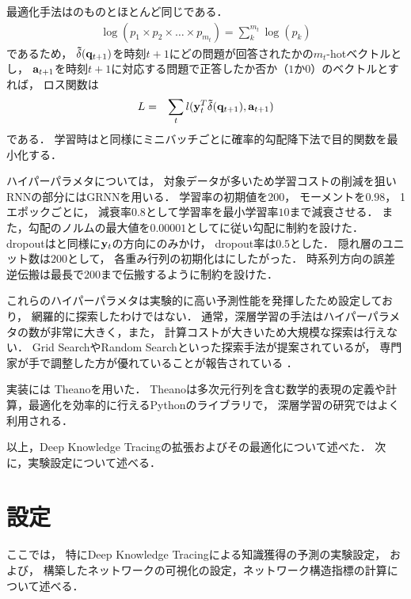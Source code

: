 最適化手法は\cite{piech2015deep}のものとほとんど同じである．
\begin{eqnarray}
	\log(p_1 \times p_2 \times \dots \times p_{m_t}) = \sum_{k}^{m_t} \log(p_k)
\end{eqnarray}
であるため，
${\bf\tilde{ \delta}}({\bf q}_{t+1})$を時刻$t+1$にどの問題が回答されたかの$m_t$-hotベクトルとし，
${\bf a}_{t+1}$を時刻$t+1$に対応する問題で正答したか否か（$1$か$0$）のベクトルとすれば，
ロス関数は
\begin{eqnarray}
L &=& \sum_t l({\bf y}_t^T {\bf \tilde{\delta}}({\bf q}_{t+1}), {\bf a}_{t+1})
\end{eqnarray}
である．
学習時は\cite{piech2015deep}と同様にミニバッチごとに確率的勾配降下法で目的関数を最小化する．

ハイパーパラメタについては，
対象データが多いため学習コストの削減を狙いRNNの部分にはGRNNを用いる．
学習率の初期値を$200$，
モーメントを$0.98$，
1エポックごとに，
減衰率$0.8$として学習率を最小学習率$10$まで減衰させる．
また，勾配のノルムの最大値を$0.00001$として\cite{pascanu2013difficulty}に従い勾配に制約を設けた．
dropoutは\cite{piech2015deep}と同様に${\bf y}_t$の方向にのみかけ，
dropout率は$0.5$とした．
隠れ層のユニット数は$200$として，
各重み行列の初期化は\cite{glorot2010understanding}にしたがった．
時系列方向の誤差逆伝搬は最長で$200$まで伝搬するように制約を設けた．

これらのハイパーパラメタは実験的に高い予測性能を発揮したため設定しており，
網羅的に探索したわけではない．
通常，深層学習の手法はハイパーパラメタの数が非常に大きく，また，
計算コストが大きいため大規模な探索は行えない．
Grid SearchやRandom Search\cite{bergstra2012random}といった探索手法が提案されているが，
専門家が手で調整した方が優れていることが報告されている\cite{larochelle2007empirical, bergstra2012random}
．

実装には
Theanoを用いた\cite{bergstra+al:2010-scipy,Bastien-Theano-2012}．
Theanoは多次元行列を含む数学的表現の定義や計算，最適化を効率的に行えるPythonのライブラリで，
深層学習の研究ではよく利用される．


以上，Deep Knowledge Tracingの拡張およびその最適化について述べた．
次に，実験設定について述べる．

\section{設定}
ここでは，
特にDeep Knowledge Tracingによる知識獲得の予測の実験設定，
および，
構築したネットワークの可視化の設定，ネットワーク構造指標の計算について述べる．


